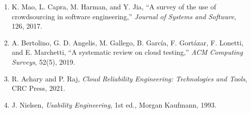 \begin{enumerate}[leftmargin=2.2em]
\item K. Mao, L. Capra, M. Harman, and Y. Jia, ``A survey of the use of crowdsourcing in software engineering,'' \textit{Journal of Systems and Software}, 126, 2017.
\item A. Bertolino, G. D. Angelis, M. Gallego, B. García, F. Gortázar, F. Lonetti, and E. Marchetti, ``A systematic review on cloud testing,'' \textit{ACM Computing Surveys}, 52(5), 2019.
\item R. Achary and P. Raj, \textit{Cloud Reliability Engineering: Technologies and Tools}, CRC Press, 2021.
\item J. Nielsen, \textit{Usability Engineering}, 1st ed., Morgan Kaufmann, 1993.
\end{enumerate}
